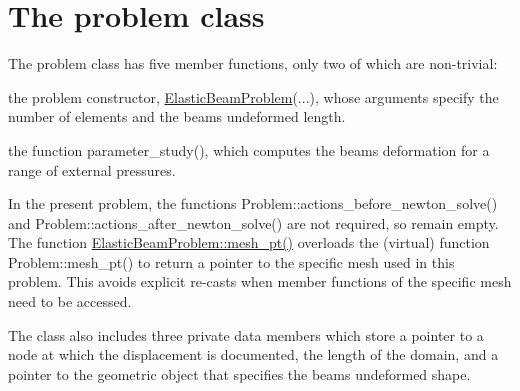 \hypertarget{index_problem}{}\section{The problem class}\label{index_problem}
The problem class has five member functions, only two of which are non-\/trivial\+:
\begin{DoxyItemize}
\item the problem constructor, {\ttfamily \hyperlink{classElasticBeamProblem}{Elastic\+Beam\+Problem}}(...), whose arguments specify the number of elements and the beam\textquotesingle{}s undeformed length.
\item the function {\ttfamily parameter\+\_\+study()}, which computes the beam\textquotesingle{}s deformation for a range of external pressures.
\end{DoxyItemize}

In the present problem, the functions {\ttfamily Problem\+::actions\+\_\+before\+\_\+newton\+\_\+solve()} and {\ttfamily Problem\+::actions\+\_\+after\+\_\+newton\+\_\+solve()} are not required, so remain empty. The function {\ttfamily \hyperlink{classElasticBeamProblem_ae7d14ba8bec2325a82cbeed0c1b29910}{Elastic\+Beam\+Problem\+::mesh\+\_\+pt()}} overloads the (virtual) function {\ttfamily Problem\+::mesh\+\_\+pt()} to return a pointer to the specific mesh used in this problem. This avoids explicit re-\/casts when member functions of the specific mesh need to be accessed.

The class also includes three private data members which store a pointer to a node at which the displacement is documented, the length of the domain, and a pointer to the geometric object that specifies the beam\textquotesingle{}s undeformed shape.

